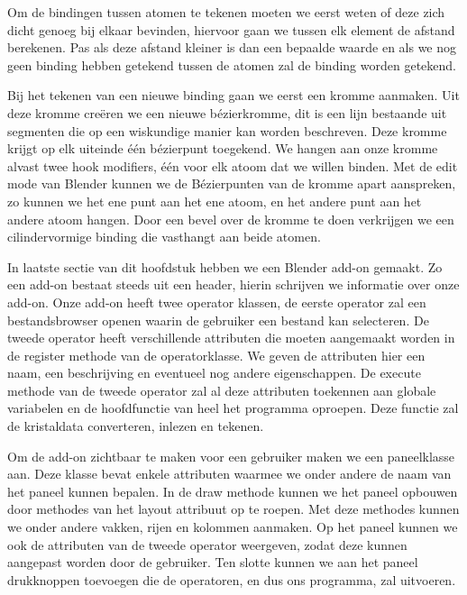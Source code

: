 \par   
Om de bindingen tussen atomen te tekenen moeten we eerst weten of deze zich dicht genoeg bij elkaar bevinden, hiervoor gaan we tussen elk element de afstand berekenen. Pas als deze afstand kleiner is dan een bepaalde waarde en als we nog geen binding hebben getekend tussen de atomen zal de binding worden getekend.
\par
Bij het tekenen van een nieuwe binding gaan we eerst een kromme aanmaken. Uit deze kromme creëren we een nieuwe bézierkromme, dit is een lijn bestaande uit segmenten die op een wiskundige manier kan worden beschreven. Deze kromme krijgt op elk uiteinde één bézierpunt toegekend. We hangen aan onze kromme alvast twee hook modifiers, één voor elk atoom dat we willen binden. Met de edit mode van Blender kunnen we de Bézierpunten van de kromme apart aanspreken, zo kunnen we het ene punt aan het ene atoom, en het andere punt aan het andere atoom hangen. Door een bevel over de kromme te doen verkrijgen we een cilindervormige binding die vasthangt aan beide atomen.
\par
In laatste sectie van dit hoofdstuk hebben we een Blender add-on gemaakt. Zo een add-on bestaat steeds uit een header, hierin schrijven we informatie over onze add-on. Onze add-on heeft twee operator klassen, de eerste operator zal een bestandsbrowser openen waarin de gebruiker een bestand kan selecteren. De tweede operator heeft verschillende attributen die moeten aangemaakt worden in de register methode van de operatorklasse. We geven de attributen hier een naam, een beschrijving en eventueel nog andere eigenschappen. De execute methode van de tweede operator zal al deze attributen toekennen aan globale variabelen en de hoofdfunctie van heel het programma oproepen. Deze functie zal de kristaldata converteren, inlezen en tekenen.
\par 
Om de add-on zichtbaar te maken voor een gebruiker maken we een paneelklasse aan. Deze klasse bevat enkele attributen waarmee we onder andere de naam van het paneel kunnen bepalen. In de draw methode kunnen we het paneel opbouwen door methodes van het layout attribuut op te roepen. Met deze methodes kunnen we onder andere vakken, rijen en kolommen aanmaken. Op het paneel kunnen we ook de attributen van de tweede operator weergeven, zodat deze kunnen aangepast worden door de gebruiker. Ten slotte kunnen we aan het paneel drukknoppen toevoegen die de operatoren, en dus ons programma, zal uitvoeren. 



